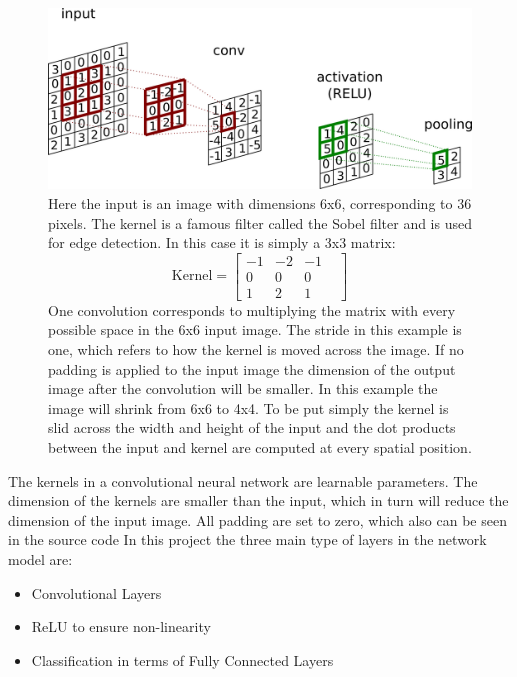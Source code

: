 \documentclass[12pt, fleqn, titlepage]{article}
\begin{document}
	\begin{figure}[H]
		\centering
		\includegraphics[width=0.65\linewidth, trim={0 0 69cm 0},clip]{imgs/convolution}
		\caption{Here the input is an image with dimensions 6x6, corresponding to 36 pixels. The kernel is a famous filter called the Sobel filter and is used for edge detection. In this case it is simply a 3x3 matrix: 
			\[ \text{Kernel} = \begin{bmatrix}
				-1 & -2 & -1 & \\ 0 & 0 & 0 &  \\
				1 & 2 & 1
			\end{bmatrix}  \] 
		One convolution corresponds to multiplying the matrix with every possible space in the 6x6 input image. The stride in this example is one, which refers to how the kernel is moved across the image. If no padding is applied to the input image the dimension of the output image after the convolution will be smaller. In this example the image will shrink from 6x6 to 4x4. To be put simply the kernel is slid across the width and height of the input and the dot products between the input and kernel are computed at every spatial position. \cite{cnn_paper} }
		\label{fig:convolution}
	\end{figure}
	
	The kernels in a convolutional neural network are learnable parameters. The dimension of the kernels are smaller than the input, which in turn will reduce the dimension of the input image. All padding are set to zero, which also can be seen in the source code %
	In this project the three main type of layers in the network model are:

	\begin{itemize}
	\item Convolutional Layers 
	\item ReLU to ensure non-linearity 
	\item Classification in terms of Fully Connected Layers
	\end{itemize}
	
\end{document}
